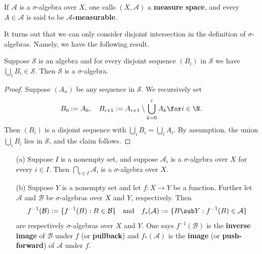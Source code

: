 If $\mathcal{A}$ is a $\sigma$-algebra over $X$, one calls $(X,\mathcal{A})$ a \textbf{measure space}, and every $A\in\mathcal{A}$ is said to be 
\textbf{$\mathcal{A}$-measurable}.\par
It turns out that we can only consider disjoint intersection in the definition of $\sigma$-algebras. Namely, we have the following result.
\begin{proposition}
Suppose $\mathcal{S}$ is an algebra and for every disjoint sequence $(B_i)$ in $\mathcal{S}$ we have $\bigcup_{i}B_i\in\mathcal{S}$. Then $\mathcal{S}$ is a $\sigma$-algebra.
\end{proposition}
\begin{proof}
Suppose $(A_n)$ be any sequence in $\mathcal{S}$. We recursively set
\[B_0:=A_0,\quad B_{i+1}:=A_{i+1}\setminus\bigcup_{k=0}^{i}A_k\for i\in\N.\]
Then $(B_i)$ is a disjoint sequence with $\bigcup_{i}B_i=\bigcup_{i}A_i$. By assumption, the union $\bigcup_{i}B_i$ lies in $\mathcal{S}$, and the claim follows.
\end{proof}
\begin{example}\label{sigma alg eg}
\mbox{}
\begin{itemize}
\item[(a)] Suppose $I$ is a nonempty set, and suppose $\mathcal{A}_i$ is a $\sigma$-algebra over $X$ for every $i\in I$. Then $\bigcap_{i\in I}\mathcal{A}_i$ is a 
$\sigma$-algebra over $X$.
\item[(b)] Suppose $Y$ is a nonempty set and let $f:X\to Y$ be a function. Further let $\mathcal{A}$ and $\mathcal{B}$ be $\sigma$-algebras over $X$ and $Y$, respectively. Then
\[f^{-1}(\mathcal{B}):=\{f^{-1}(B):B\in\mathcal{B}\}\quad\text{and}\quad f_*(\mathcal{A}):=\{B\sub Y:f^{-1}(B)\in\mathcal{A}\}\]
are respectively $\sigma$-algebras over $X$ and $Y$. One says $f^{-1}(\mathcal{B})$ is the \textbf{inverse image} of $\mathcal{B}$ under $f$ (or \textbf{pullback}) and $f_*(\mathcal{A})$ is the \textbf{image} (or \textbf{push-forward}) of $\mathcal{A}$ under $f$.
\end{itemize}
\end{example}
